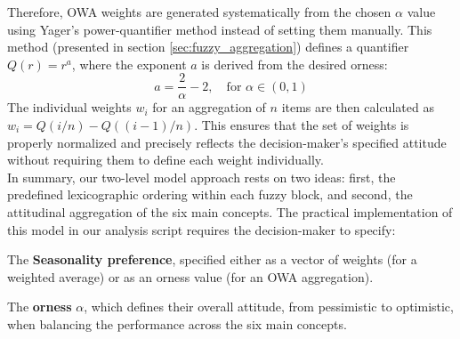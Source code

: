 Therefore, OWA weights are generated systematically from the chosen $\alpha$ value using Yager's power-quantifier method instead of setting them manually. This method (presented in section \ref{sec:fuzzy_aggregation}) defines a quantifier $Q(r) = r^a$, where the exponent $a$ is derived from the desired orness:
\begin{equation}
a = \frac{2}{\alpha} - 2, \quad \text{for } \alpha \in (0, 1)
\end{equation}
The individual weights $w_i$ for an aggregation of $n$ items are then calculated as $w_i = Q(i/n) - Q((i-1)/n)$. This ensures that the set of weights is properly normalized and precisely reflects the decision-maker's specified attitude without requiring them to define each weight individually.\\

In summary, our two-level model approach rests on two ideas: first, the predefined lexicographic ordering within each fuzzy block, and second, the attitudinal aggregation of the six main concepts. The practical implementation of this model in our analysis script requires the decision-maker to specify:
\begin{romanenum}
    \item The \textbf{Seasonality preference}, specified either as a vector of weights (for a weighted average) or as an orness value (for an OWA aggregation).
    \item The \textbf{orness} $\alpha$, which defines their overall attitude, from pessimistic to optimistic, when balancing the performance across the six main concepts.
\end{romanenum}